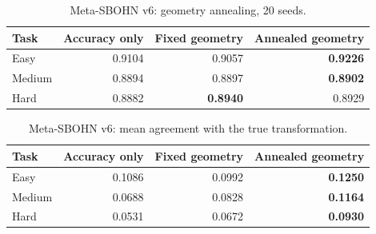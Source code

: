 \begin{table}[h]
\centering
\caption{Meta-SBOHN v6: geometry annealing, 20 seeds.}
\begin{tabular}{l r r r}
\hline
Task & Accuracy only & Fixed geometry & Annealed geometry \\
\hline
Easy & 0.9104 & 0.9057 & \textbf{0.9226} \\
Medium & 0.8894 & 0.8897 & \textbf{0.8902} \\
Hard & 0.8882 & \textbf{0.8940} & 0.8929 \\
\hline
\end{tabular}
\end{table}

\begin{table}[h]
\centering
\caption{Meta-SBOHN v6: mean agreement with the true transformation.}
\begin{tabular}{l r r r}
\hline
Task & Accuracy only & Fixed geometry & Annealed geometry \\
\hline
Easy & 0.1086 & 0.0992 & \textbf{0.1250} \\
Medium & 0.0688 & 0.0828 & \textbf{0.1164} \\
Hard & 0.0531 & 0.0672 & \textbf{0.0930} \\
\hline
\end{tabular}
\end{table}
